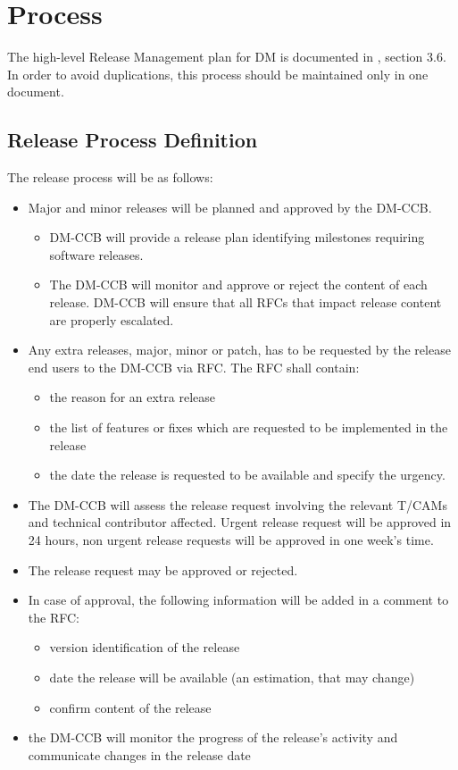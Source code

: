 \section{Process} \label{sec:process}


The high-level \gls{Release} Management plan for \gls{DM} is documented in , section 3.6. 
In order to avoid duplications, this process should be maintained only in one document.


\subsection{Release Process Definition}

The release process will be as follows:

\begin{itemize}
\item Major and minor releases will be planned and approved by the DM-CCB.
\begin{itemize}
  \item  DM-CCB will provide  a release plan identifying  milestones requiring software releases.
  \item The DM-CCB will monitor and approve or reject the content of each release. DM-CCB will ensure that  all RFCs that impact  release content are properly escalated.
\end{itemize}
\item Any extra releases, major, minor or \gls{patch}, has to be requested by the release end users to the DM-CCB via \gls{RFC}. The \gls{RFC} shall contain:
\begin{itemize}
  \item the reason for an extra release
  \item the list of features or fixes which are requested to be implemented in the release
  \item the date the release is requested to be available and specify the urgency.
\end{itemize}
\item The DM-CCB will assess the release request involving the relevant T/CAMs and technical contributor affected.
Urgent release request will be approved in 24 hours, non urgent release requests will be approved in one week's time.
\item The release request may be approved or rejected.
\item In case of approval, the following information will be added in a comment to the RFC:
\begin{itemize}
  \item version identification of the release
  \item date the release will be available (an estimation, that may change)
  \item confirm content of the release
\end{itemize}
\item the DM-CCB will monitor the progress of the release's activity and communicate changes in the release date
\end{itemize}


